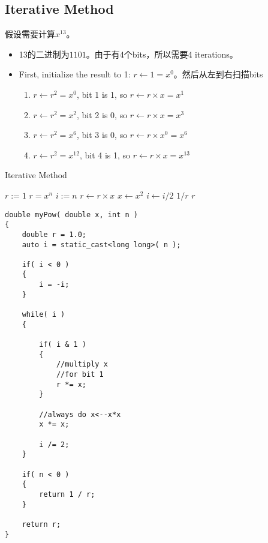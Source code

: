 \subsection{Iterative Method}
假设需要计算$x^{13}$。
\begin{itemize}
\item 13的二进制为$1101$。由于有4个bits，所以需要4 iterations。
\item First, initialize the result to 1: $r\gets 1 = x^0$。然后从左到右扫描bits
\begin{enumerate}
\item $r\gets r^2 = x^0$, bit 1 is 1, so $r\gets r\times x = x^1$
\item $r\gets r^2 = x^2$, bit 2 is 0, so $r\gets r\times x = x^3$
\item $r\gets r^2 = x^6$, bit 3 is 0, so $r\gets r\times x^0 = x^6$
\item $r\gets r^2 = x^{12}$, bit 4 is 1, so $r\gets r\times x = x^{13}$
\end{enumerate} 
\end{itemize}
\begin{algorithm}[H]
\caption{Iterative Method}
\begin{algorithmic}[1]
\State $r := 1$ \Comment $r = x^n$ 
\State $i:=n$
\State $r \gets r \times x$
\EndIf
\State $x\gets x^2$
\State $i \gets i / 2$
\EndWhile
{}
\State \Return $1/r$
\Else
\State \Return $r$
\EndIf
\EndProcedure
\end{algorithmic}
\end{algorithm}

\setcounter{lstlisting}{0}
\begin{lstlisting}[style=customc, caption={Iterative}]
double myPow( double x, int n )
{
    double r = 1.0;
    auto i = static_cast<long long>( n );

    if( i < 0 )
    {
        i = -i;
    }

    while( i )
    {

        if( i & 1 )
        {
            //multiply x
            //for bit 1
            r *= x;
        }

        //always do x<--x*x
        x *= x;

        i /= 2;
    }

    if( n < 0 )
    {
        return 1 / r;
    }

    return r;
}
\end{lstlisting}
